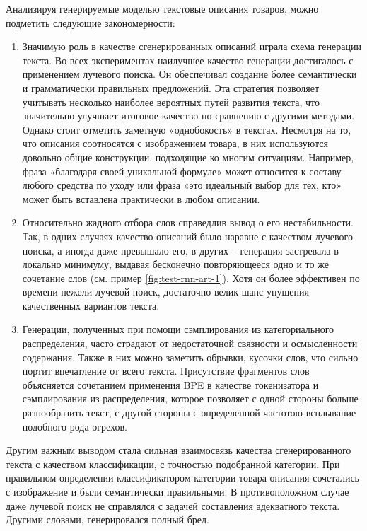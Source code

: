 \documentclass[a4paper,12pt]{extarticle}
\begin{document}
Анализируя генерируемые моделью текстовые описания товаров, можно подметить следующие закономерности:
\begin{enumerate}[label=\arabic*.]
	\item Значимую роль в качестве сгенерированных описаний играла схема генерации текста. Во всех экспериментах наилучшее качество генерации достигалось с применением лучевого поиска. Он обеспечивал создание более семантически и грамматически правильных предложений. Эта стратегия позволяет учитывать несколько наиболее вероятных путей развития текста, что значительно улучшает итоговое качество по сравнению с другими методами. Однако стоит отметить заметную «однобокость» в текстах. Несмотря на то, что описания соотносятся с изображением товара, в них используются довольно общие конструкции, подходящие ко многим ситуациям. Например, фраза «благодаря своей уникальной формуле» может относится к составу любого средства по уходу или фраза «это идеальный выбор для тех, кто» может быть вставлена практически в любом описании.
	\item Относительно жадного отбора слов справедлив вывод о его нестабильности. Так, в одних случаях качество описаний было наравне с качеством лучевого поиска, а иногда даже превышало его, в других – генерация застревала в локально минимуму, выдавая бесконечно повторяющееся одно и то же сочетание слов (см. пример \ref{fig:test-rnn-art-1}). Хотя он более эффективен по времени нежели лучевой поиск, достаточно велик шанс упущения качественных вариантов текста. 
	\item Генерации, полученных при помощи сэмплирования из категориального распределения, часто страдают от недостаточной связности и осмысленности содержания. Также в них можно заметить обрывки, кусочки слов, что сильно портит впечатление от всего текста. Присутствие фрагментов слов объясняется сочетанием применения BPE в качестве токенизатора и сэмплирования из распределения, которое позволяет с одной стороны больше разнообразить текст, с другой стороны с определенной частотою всплывание подобного рода огрехов.
\end{enumerate}

Другим важным выводом стала сильная взаимосвязь качества сгенерированного текста с качеством классификации, с точностью подобранной категории. При правильном определении классификатором категории товара описания сочетались с изображение и были семантически правильными. В противоположном случае даже лучевой поиск не справлялся с задачей составления адекватного текста. Другими словами, генерировался полный бред.
\end{document}
